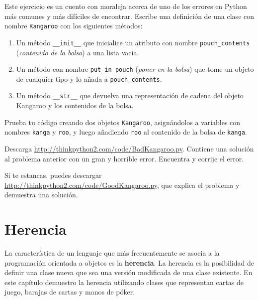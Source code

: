 \documentclass[10pt]{book}
\begin{document}
\begin{exercise}
\label{kangaroo}

Este ejercicio es un cuento con moraleja acerca de uno de los errores
en Python más comunes y más difíciles de encontrar.
Escribe una definición de una clase con nombre {\tt Kangaroo} con los siguientes
métodos:

\begin{enumerate}

\item Un método \verb"__init__" que inicialice un atributo con nombre
\verb"pouch_contents" ({\em contenido de la bolsa}) a una lista vacía.

\item Un método con nombre \verb"put_in_pouch" ({\em poner en la bolsa}) que tome un objeto
de cualquier tipo y lo añada a \verb"pouch_contents".

\item Un método \verb"__str__" que devuelva una representación de cadena
del objeto Kangaroo y los contenidos de la bolsa.

\end{enumerate}
%
Prueba tu código
creando dos objetos {\tt Kangaroo}, asignándolos a variables
con nombres {\tt kanga} y {\tt roo}, y luego añadiendo {\tt roo} al
contenido de la bolsa de {\tt kanga}.

Descarga \url{http://thinkpython2.com/code/BadKangaroo.py}.  Contiene
una solución al problema anterior con un gran y horrible error.
Encuentra y corrije el error.

Si te estancas, puedes descargar
\url{http://thinkpython2.com/code/GoodKangaroo.py}, que explica el
problema y demuestra una solución.

\end{exercise}



\chapter{Herencia}

La característica de un lenguaje que más frecuentemente se asocia a la programación
orientada a objetos es la {\bf herencia}.  La herencia es la posibilidad de
definir una clase nueva que sea una versión modificada de una clase existente.
En este capítulo demuestro la herencia utilizando clases que representan
cartas de juego, barajas de cartas y manos de póker.
\end{document}
